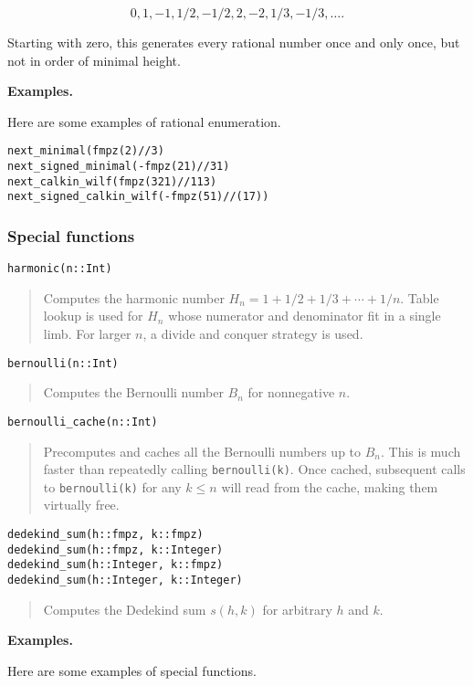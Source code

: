 \documentclass[a4paper,10pt]{article}
\newcommand{\code}{\lstinline}
\newcommand{\desc}[1]{\vspace{-3mm}\begin{quote}#1\end{quote}}
\begin{document}
{{{$$0, 1, -1, 1/2, -1/2, 2, -2, 1/3, -1/3, \ldots.$$

Starting with zero, this generates every rational number once and only once,
but not in order of minimal height.}

\textbf{Examples.}

Here are some examples of rational enumeration.

\begin{lstlisting}
next_minimal(fmpz(2)//3)
next_signed_minimal(-fmpz(21)//31)
next_calkin_wilf(fmpz(321)//113)
next_signed_calkin_wilf(-fmpz(51)//(17))
\end{lstlisting}

\subsubsection{Special functions}

\begin{lstlisting}
harmonic(n::Int)
\end{lstlisting}

\desc{Computes the harmonic number $H_n = 1 + 1/2 + 1/3 + \cdots + 1/n$.
Table lookup is used for $H_n$ whose numerator and denominator 
fit in a single limb. For larger $n$, a divide and conquer strategy is used.}

\begin{lstlisting}
bernoulli(n::Int)
\end{lstlisting}

\desc{Computes the Bernoulli number $B_n$ for nonnegative $n$.}

\begin{lstlisting}
bernoulli_cache(n::Int)
\end{lstlisting}

\desc{Precomputes and caches all the Bernoulli numbers up to $B_n$.
This is much faster than repeatedly calling \code{bernoulli(k)}.
Once cached, subsequent calls to \code{bernoulli(k)} for any $k \le n$
will read from the cache, making them virtually free.}

\begin{lstlisting}
dedekind_sum(h::fmpz, k::fmpz)
dedekind_sum(h::fmpz, k::Integer)
dedekind_sum(h::Integer, k::fmpz)
dedekind_sum(h::Integer, k::Integer)
\end{lstlisting}

\desc{Computes the Dedekind sum $s(h,k)$ for arbitrary $h$ and $k$.}

\textbf{Examples.}

Here are some examples of special functions.

}}
\end{document}
